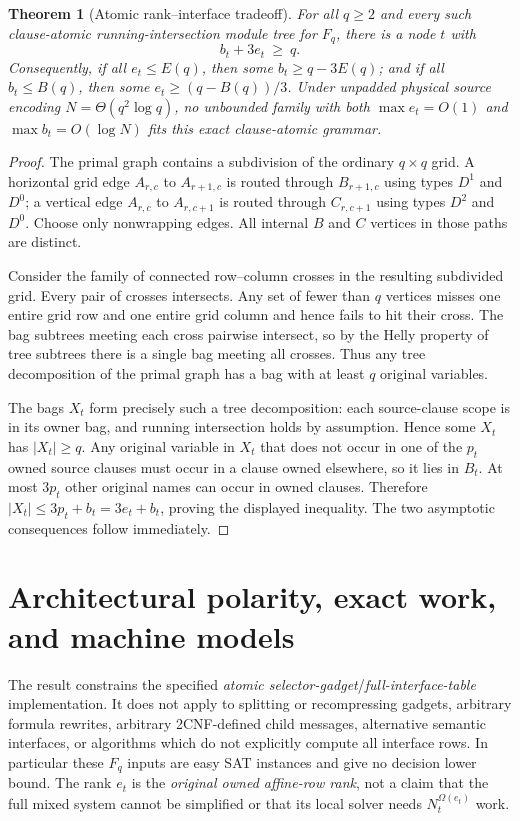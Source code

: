 \documentclass[11pt]{article}
\newtheorem{theorem}{Theorem}
\begin{document}
\begin{theorem}[Atomic rank--interface tradeoff]\label{thm:tradeoff}
For all $q\ge2$ and every such clause-atomic running-intersection module tree for $F_q$, there is a node $t$ with
\[
\boxed{\qquad b_t+3e_t\ \ge\ q.\qquad}
\]
Consequently, if all $e_t\le E(q)$, then some $b_t\ge q-3E(q)$; and if all $b_t\le B(q)$, then some $e_t\ge(q-B(q))/3$. Under unpadded physical source encoding $N=\Theta(q^2\log q)$, no unbounded family with both $\max e_t=O(1)$ and $\max b_t=O(\log N)$ fits this exact clause-atomic grammar.
\end{theorem}
\begin{proof}
The primal graph contains a subdivision of the ordinary $q\times q$ grid. A horizontal grid edge $A_{r,c}$ to $A_{r+1,c}$ is routed through $B_{r+1,c}$ using types $D^1$ and $D^0$; a vertical edge $A_{r,c}$ to $A_{r,c+1}$ is routed through $C_{r,c+1}$ using types $D^2$ and $D^0$. Choose only nonwrapping edges. All internal $B$ and $C$ vertices in those paths are distinct.

Consider the family of connected row--column crosses in the resulting subdivided grid. Every pair of crosses intersects. Any set of fewer than $q$ vertices misses one entire grid row and one entire grid column and hence fails to hit their cross. The bag subtrees meeting each cross pairwise intersect, so by the Helly property of tree subtrees there is a single bag meeting all crosses. Thus any tree decomposition of the primal graph has a bag with at least $q$ original variables.

The bags $X_t$ form precisely such a tree decomposition: each source-clause scope is in its owner bag, and running intersection holds by assumption. Hence some $X_t$ has $|X_t|\ge q$. Any original variable in $X_t$ that does not occur in one of the $p_t$ owned source clauses must occur in a clause owned elsewhere, so it lies in $B_t$. At most $3p_t$ other original names can occur in owned clauses. Therefore $|X_t|\le3p_t+b_t=3e_t+b_t$, proving the displayed inequality. The two asymptotic consequences follow immediately.
\end{proof}

\section{Architectural polarity, exact work, and machine models}
The result constrains the specified \emph{atomic selector-gadget}\slash\emph{full-interface-table} implementation. It does not apply to splitting or recompressing gadgets, arbitrary formula rewrites, arbitrary 2CNF-defined child messages, alternative semantic interfaces, or algorithms which do not explicitly compute all interface rows. In particular these $F_q$ inputs are easy SAT instances and give no decision lower bound. The rank $e_t$ is the \emph{original owned affine-row rank}, not a claim that the full mixed system cannot be simplified or that its local solver needs $N_t^{\Omega(e_t)}$ work.
\end{document}
